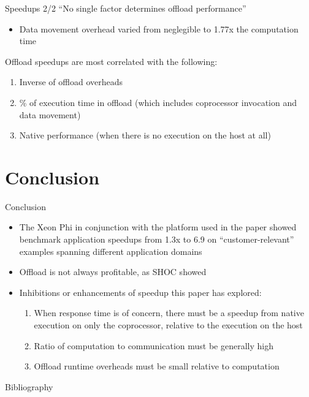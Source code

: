 \documentclass[screen]{beamer}
\begin{document}
\begin{frame}{Speedups 2/2}
    ``No single factor determines offload performance''
    \begin{itemize}[<+-| alert@+>]
        \item Data movement overhead varied from neglegible to 1.77x the computation time
    \end{itemize}
    Offload speedups are most correlated with the following:
    \begin{enumerate}[<+-| alert@+>]
        \item Inverse of offload overheads
        \item \% of execution time in offload (which includes coprocessor invocation and data movement)
        \item Native performance (when there is no execution on the host at all)
    \end{enumerate}
\end{frame}

\section{Conclusion}

\begin{frame}{Conclusion}
    \begin{itemize}
        \item The Xeon Phi in conjunction with the platform used in the paper showed benchmark application speedups from 1.3x to 6.9 on ``customer-relevant'' examples spanning different application domains
        \item Offload is not always profitable, as SHOC showed
        \item Inhibitions or enhancements of speedup this paper has explored:
        \begin{enumerate}
            \item When response time is of concern, there must be a speedup from native execution on only the coprocessor, relative to the execution on the host
            \item Ratio of computation to communication must be generally high
            \item Offload runtime overheads must be small relative to computation
        \end{enumerate}
    \end{itemize}
\end{frame}

\begin{frame}{Bibliography}
    
\end{frame}
\end{document}
